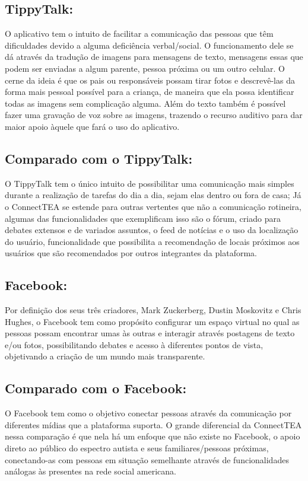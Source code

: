 \documentclass[
    12pt,               %
    openright,          %
    oneside,
    a4paper,            %
    paginasA3,  %
    BIBLATEX,           %
    REFINDENT,          %
    MODELO,             %
    TODO,               %
    english,            %
    brazil              %
    ]{ifsp-spo-inf-ctds} %
\begin{document}
\begin{apendicesenv}
\subsection{TippyTalk:}
O aplicativo tem o intuito de facilitar a comunicação das pessoas que têm dificuldades devido a alguma deficiência verbal/social. O funcionamento dele se dá através da tradução de imagens para mensagens de texto, mensagens essas que podem ser enviadas a algum parente, pessoa próxima ou um outro celular.
O cerne da ideia é que os pais ou responsáveis possam tirar fotos e descrevê-las da forma mais pessoal possível para a criança, de maneira que ela possa identificar todas as imagens sem complicação alguma.
Além do texto também é possível fazer uma gravação de voz sobre as imagens, trazendo o recurso auditivo para dar maior apoio àquele que fará o uso do aplicativo.

\subsection{Comparado com o TippyTalk:}
O TippyTalk tem o único intuito de possibilitar uma comunicação mais simples durante a realização de tarefas do dia a dia, sejam elas dentro ou fora de casa; Já o ConnectTEA se estende para outras vertentes que não a comunicação rotineira, algumas das funcionalidades que exemplificam isso são o fórum, criado para debates extensos e de variados assuntos, o feed de notícias e o uso da localização do usuário, funcionalidade que possibilita a recomendação de locais próximos aos usuários que são recomendados por outros integrantes da plataforma.


\subsection{Facebook:}
Por definição dos seus três criadores, Mark Zuckerberg, Dustin Moskovitz e Chris Hughes, o Facebook tem como propósito configurar um espaço virtual no qual as pessoas possam encontrar umas às outras e interagir através postagens de texto e/ou fotos, possibilitando debates e acesso à diferentes pontos de vista, objetivando a criação de um mundo mais transparente.

\subsection{Comparado com o Facebook:}
O Facebook tem como o objetivo conectar pessoas através da comunicação por diferentes mídias que a plataforma suporta. O grande diferencial da ConnectTEA nessa comparação é que nela há um enfoque que não existe no Facebook, o apoio direto ao público do espectro autista e seus familiares/pessoas próximas, conectando-as com pessoas em situação semelhante através de funcionalidades análogas às presentes na rede social americana.






\end{apendicesenv}
\end{document}
